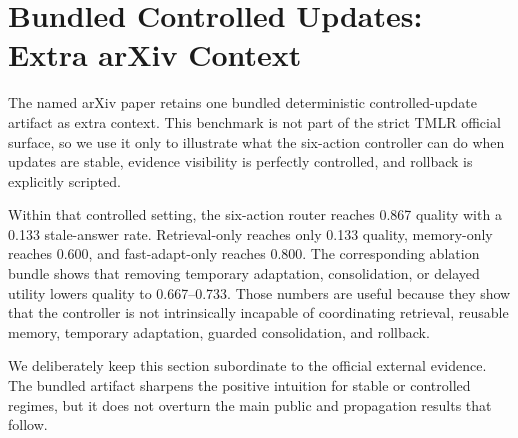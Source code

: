 \section{Bundled Controlled Updates: Extra arXiv Context}

The named arXiv paper retains one bundled deterministic controlled-update artifact as extra context. This benchmark is not part of the strict TMLR official surface, so we use it only to illustrate what the six-action controller can do when updates are stable, evidence visibility is perfectly controlled, and rollback is explicitly scripted.

\begin{table}[h]
\centering
\small

\caption{Bundled controlled-update artifact. This table is supplementary arXiv-only context rather than part of the official TMLR benchmark surface.}
\label{tab:freshness-main}
\end{table}

Within that controlled setting, the six-action router reaches 0.867 quality with a 0.133 stale-answer rate. Retrieval-only reaches only 0.133 quality, memory-only reaches 0.600, and fast-adapt-only reaches 0.800. The corresponding ablation bundle shows that removing temporary adaptation, consolidation, or delayed utility lowers quality to 0.667--0.733. Those numbers are useful because they show that the controller is not intrinsically incapable of coordinating retrieval, reusable memory, temporary adaptation, guarded consolidation, and rollback.

We deliberately keep this section subordinate to the official external evidence. The bundled artifact sharpens the positive intuition for stable or controlled regimes, but it does not overturn the main public and propagation results that follow.

